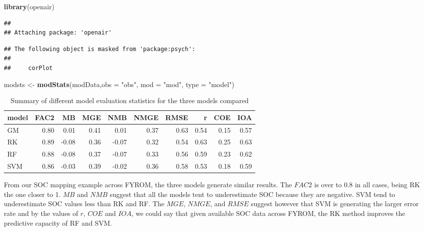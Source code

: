 \documentclass[10pt,b5paper,]{book}
\newenvironment{Shaded}{\begin{snugshade}}{\end{snugshade}}
\newcommand{\DataTypeTok}[1]{\textcolor[rgb]{0.13,0.29,0.53}{#1}}
\newcommand{\KeywordTok}[1]{\textcolor[rgb]{0.13,0.29,0.53}{\textbf{#1}}}
\newcommand{\NormalTok}[1]{#1}
\newcommand{\StringTok}[1]{\textcolor[rgb]{0.31,0.60,0.02}{#1}}
\theoremstyle{definition}
\theoremstyle{definition}
\theoremstyle{definition}
\theoremstyle{remark}
\begin{document}
\begin{Shaded}
\begin{Highlighting}[]
\KeywordTok{library}\NormalTok{(openair)}
\end{Highlighting}
\end{Shaded}

\begin{verbatim}
## 
## Attaching package: 'openair'
\end{verbatim}

\begin{verbatim}
## The following object is masked from 'package:psych':
## 
##     corPlot
\end{verbatim}

\begin{Shaded}
\begin{Highlighting}[]
\NormalTok{modsts <-}\StringTok{ }\KeywordTok{modStats}\NormalTok{(modData,}\DataTypeTok{obs =} \StringTok{"obs"}\NormalTok{, }\DataTypeTok{mod =} \StringTok{"mod"}\NormalTok{, }\DataTypeTok{type =} \StringTok{"model"}\NormalTok{)}
\end{Highlighting}
\end{Shaded}

\begin{table}

\caption{\label{tab:modsts}Summary of different model evaluation statistics for the three models compared}
\centering
\begin{tabular}[t]{lrrrrrrrrr}
\toprule
model & FAC2 & MB & MGE & NMB & NMGE & RMSE & r & COE & IOA\\
\midrule
GM & 0.80 & 0.01 & 0.41 & 0.01 & 0.37 & 0.63 & 0.54 & 0.15 & 0.57\\
RK & 0.89 & -0.08 & 0.36 & -0.07 & 0.32 & 0.54 & 0.63 & 0.25 & 0.63\\
RF & 0.88 & -0.08 & 0.37 & -0.07 & 0.33 & 0.56 & 0.59 & 0.23 & 0.62\\
SVM & 0.86 & -0.03 & 0.39 & -0.02 & 0.36 & 0.58 & 0.53 & 0.18 & 0.59\\
\bottomrule
\end{tabular}
\end{table}

From our SOC mapping example across FYROM, the three models generate
similar results. The \(FAC2\) is over to 0.8 in all cases, being RK the
one closer to 1. \(MB\) and \(NMB\) suggest that all the models tent to
underestimate SOC because they are negative. SVM tend to underestimate
SOC values less than RK and RF. The \(MGE\), \(NMGE\), and \(RMSE\)
suggest however that SVM is generating the larger error rate and by the
values of \(r\), \(COE\) and \(IOA\), we could say that given available
SOC data across FYROM, the RK method improves the predictive capacity of
RF and SVM.
\end{document}
